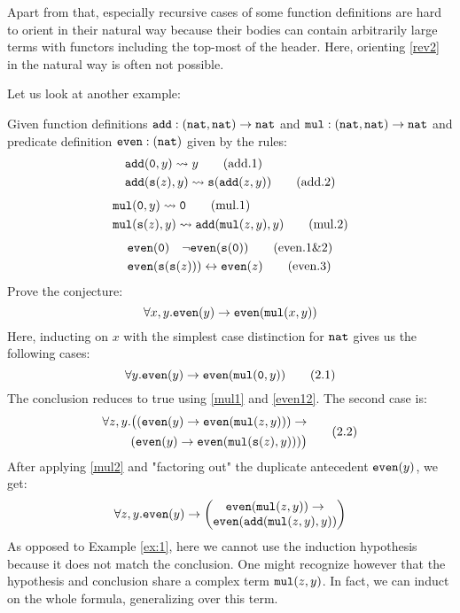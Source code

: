 Apart from that, especially recursive cases of some function definitions are hard to orient in their natural way because their bodies can contain arbitrarily large terms with functors including the top-most of the header. Here, orienting \eqref{rev2} in the natural way is often not possible.

Let us look at another example:
\begin{example}\label{ex:2}
	Given function definitions $\mathtt{add} : (\mathtt{nat},\mathtt{nat})\rightarrow\mathtt{nat}$ and $\mathtt{mul} : (\mathtt{nat},\mathtt{nat})\rightarrow\mathtt{nat}$ and predicate definition $\mathtt{even} : (\mathtt{nat})$ given by the rules:
	\begin{align}
	&\mathtt{add}(\mathtt{0},y)\rightsquigarrow y\label{add1}\tag{add.1}\\ &\mathtt{add}(\mathtt{s}(z),y)\rightsquigarrow\mathtt{s}(\mathtt{add}(z,y))\label{add2}\tag{add.2}\end{align}
	\dotfill
	\begin{align}
	&\mathtt{mul}(\mathtt{0},y)\rightsquigarrow \mathtt{0}\label{mul1}\tag{mul.1}\\
    &\mathtt{mul}(\mathtt{s}(z),y)\rightsquigarrow \mathtt{add}(\mathtt{mul}(z,y),y)\label{mul2}\tag{mul.2}\end{align}
	\dotfill
	\begin{align}
	&\mathtt{even}(\mathtt{0})\quad\neg\mathtt{even}(\mathtt{s}(\mathtt{0}))\label{even12}\tag{even.1\&2}\\
	&\mathtt{even}(\mathtt{s}(\mathtt{s}(z)))\leftrightarrow \mathtt{even}(z)\label{even3}\tag{even.3}\end{align}
	Prove the conjecture:
	$$\forall x,y. \mathtt{even}(y)\rightarrow \mathtt{even}(\mathtt{mul}(x,y))$$
	Here, inducting on $x$ with the simplest case distinction for $\mathtt{nat}$ gives us the following cases:
	\begin{equation}\forall y. \mathtt{even}(y)\rightarrow \mathtt{even}(\mathtt{mul}(\mathtt{0},y))\tag{2.1}\end{equation}
	The conclusion reduces to true using \eqref{mul1} and \eqref{even12}. The second case is:
	\begin{align}\begin{split}\forall z,y. \big((\mathtt{even}(y)\rightarrow \mathtt{even}(\mathtt{mul}(z,y)))\rightarrow\\
	(\mathtt{even}(y)\rightarrow \mathtt{even}(\mathtt{mul}(\mathtt{s}(z),y)))\big)\end{split}\tag{2.2}\end{align}
	After applying \eqref{mul2} and "factoring out" the duplicate antecedent $\mathtt{even}(y)$, we get:
	$$\forall z,y. \mathtt{even}(y)\rightarrow\begin{pmatrix}\mathtt{even}(\mathtt{mul}(z,y))\rightarrow\\
	\mathtt{even}(\mathtt{add}(\mathtt{mul}(z,y),y))\end{pmatrix}$$
	As opposed to Example \ref{ex:1}, here we cannot use the induction hypothesis because it does not match the conclusion. One might recognize however that the hypothesis and conclusion share a complex term $\mathtt{mul}(z,y)$. In fact, we can induct on the whole formula, generalizing over this term.


\end{example}
